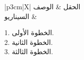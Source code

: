 \documentclass{article}
\newcommand{\ucfieldar}[2]{%
  #1 & \parbox[t]{\linewidth}{#2} \\
  \hline
}
\begin{document}
\setRTL
\begin{tabularx}{\textwidth}{|p{3cm}|X|}
\hline
الحقل & الوصف \\
\hline
\ucfieldar{السيناريو}{
1. الخطوة الأولى.\\
2. الخطوة الثانية.\\
3. الخطوة الثالثة.
}
\end{tabularx}
\end{document}
